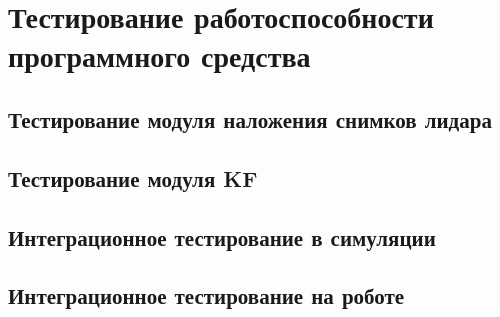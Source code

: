 \section{Тестирование работоспособности программного средства}

\subsection{Тестирование модуля наложения снимков лидара}


\subsection{Тестирование модуля KF}


\subsection{Интеграционное тестирование в симуляции}


\subsection{Интеграционное тестирование на роботе}

